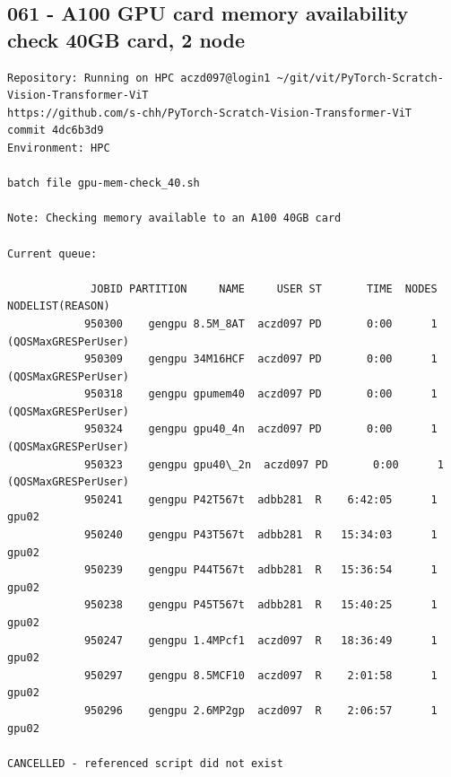 \subsection{061 - A100 GPU card memory availability check 40GB card, 2 node}
\label{app_res:061}
\begin{verbatim}
Repository: Running on HPC aczd097@login1 ~/git/vit/PyTorch-Scratch-Vision-Transformer-ViT
https://github.com/s-chh/PyTorch-Scratch-Vision-Transformer-ViT
commit 4dc6b3d9
Environment: HPC

batch file gpu-mem-check_40.sh

Note: Checking memory available to an A100 40GB card 

Current queue:

             JOBID PARTITION     NAME     USER ST       TIME  NODES NODELIST(REASON)
            950300    gengpu 8.5M_8AT  aczd097 PD       0:00      1 (QOSMaxGRESPerUser)
            950309    gengpu 34M16HCF  aczd097 PD       0:00      1 (QOSMaxGRESPerUser)
            950318    gengpu gpumem40  aczd097 PD       0:00      1 (QOSMaxGRESPerUser)
            950324    gengpu gpu40_4n  aczd097 PD       0:00      1 (QOSMaxGRESPerUser)
            950323    gengpu gpu40\_2n  aczd097 PD       0:00      1 (QOSMaxGRESPerUser)
            950241    gengpu P42T567t  adbb281  R    6:42:05      1 gpu02
            950240    gengpu P43T567t  adbb281  R   15:34:03      1 gpu02
            950239    gengpu P44T567t  adbb281  R   15:36:54      1 gpu02
            950238    gengpu P45T567t  adbb281  R   15:40:25      1 gpu02
            950247    gengpu 1.4MPcf1  aczd097  R   18:36:49      1 gpu02
            950297    gengpu 8.5MCF10  aczd097  R    2:01:58      1 gpu02
            950296    gengpu 2.6MP2gp  aczd097  R    2:06:57      1 gpu02

CANCELLED - referenced script did not exist
            
\end{verbatim}




